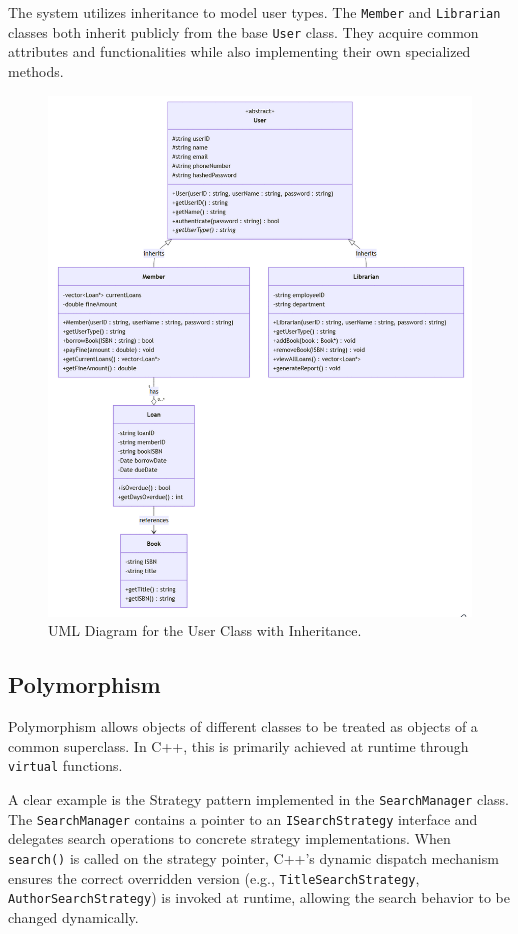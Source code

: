 The system utilizes inheritance to model user types. The \texttt{Member} and \texttt{Librarian} classes both inherit publicly from the base \texttt{User} class. They acquire common attributes and functionalities while also implementing their own specialized methods.

\begin{figure}[H]
	\centering
	\includegraphics[width=1\textwidth]{figures/inheritance.png}
	\caption{UML Diagram for the User Class with Inheritance.}
	\label{fig:user_class_inheritance}
\end{figure}

\subsection{Polymorphism}
Polymorphism allows objects of different classes to be treated as objects of a common superclass. In C++, this is primarily achieved at runtime through \texttt{virtual} functions.

A clear example is the Strategy pattern implemented in the \texttt{SearchManager} class. The \texttt{SearchManager} contains a pointer to an \texttt{ISearchStrategy} interface and delegates search operations to concrete strategy implementations. When \texttt{search()} is called on the strategy pointer, C++'s dynamic dispatch mechanism ensures the correct overridden version (e.g., \texttt{TitleSearchStrategy}, \texttt{AuthorSearchStrategy}) is invoked at runtime, allowing the search behavior to be changed dynamically.

